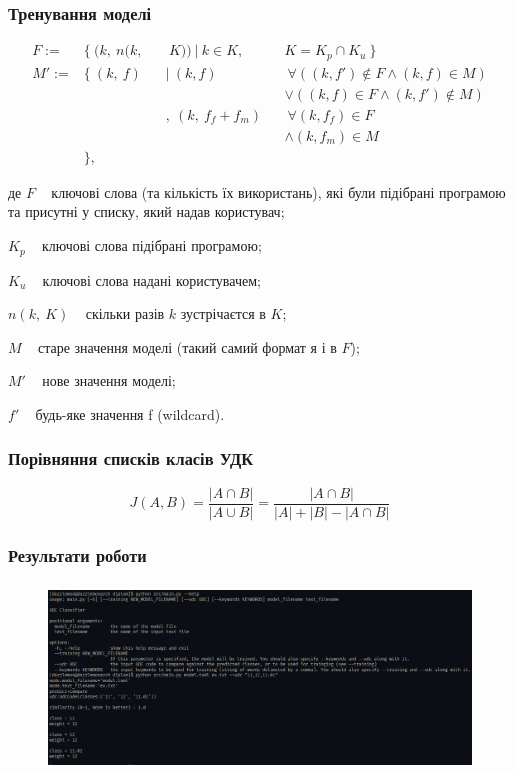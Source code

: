 \documentclass{beamer}
\begin{document}
\begin{frame}
	\frametitle{Тренування моделі}
	\begin{equation}
    \begin{alignedat}{3}
      F := &\{~ (k,~ n(k,&&~ K)) ~|~ k \in K,~ &&K = K_p \cap K_u ~\} \\
      M':= &\{~ (k,~ f)  &&|~ (k, f)          &&~\forall ((k, f') \notin F
           \land   (k, f) \in M) \\
           &             &&                    &&\lor   ((k, f) \in F
           \land   (k, f') \notin M) \\
           &             &&,~ (k,~ f_f + f_m) &&~\forall (k, f_f) \in F \\
           &             &&                    &&\land   (k, f_m) \in M \\
           &\},
    \end{alignedat}
	\nonumber
\end{equation}

де $F$ \textemdash~ ключові слова (та кількість їх використань),
      які були підібрані програмою та присутні у списку, який надав користувач;

  $K_p$ \textemdash~ ключові слова підібрані програмою;

  $K_u$ \textemdash~ ключові слова надані користувачем;

  $n(k,~ K)$ \textemdash~ скільки разів $k$ зустрічаєтся в $K$;

  $M$ \textemdash~ старе значення моделі (такий самий формат я і в $F$);

  $M'$ \textemdash~ нове значення моделі;

  $f'$ \textemdash~ будь-яке значення f (wildcard).

\end{frame}

\begin{frame}
	\frametitle{Порівняння списків класів УДК}
	\begin{equation}
    J(A, B) =  \frac{| A \cap B |}{ | A \cup B | }
    = \frac{| A \cap B | }{  |A| + |B| - | A \cap B | }
	\nonumber
\end{equation}
\end{frame}

\begin{frame}
	\frametitle{Результати роботи}
	\begin{figure}
		\centering
		\includegraphics[height=5cm]{example.png}
	\end{figure}
\end{frame}
\end{document}
